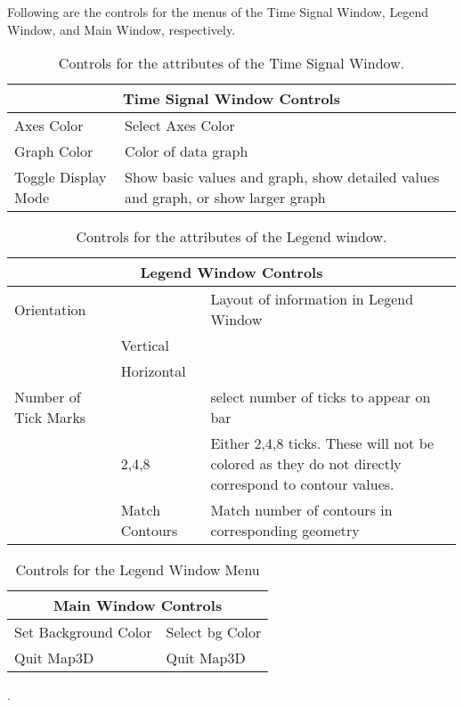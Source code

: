 Following are the controls for the menus of the Time Signal Window, Legend
Window, and Main Window, respectively.

\begin{table}[ht]
  \begin{center}
    \begin{tabular}{|l|p{4in}|} \hline
      \multicolumn{2}{|c|}{\textbf{Time Signal Window Controls}}
      \\ \hline \hline
      Axes Color & Select Axes Color \\
      Graph Color & Color of data graph \\  
      Toggle Display Mode & Show basic values and graph, show
      detailed values and graph, or show larger
      graph\\ \hline
    \end{tabular}
  \end{center}
\caption{Controls for the attributes of the Time Signal Window.}
\end{table}


\begin{table}[ht]
  \begin{center}
    \begin{tabular}{|l|l|p{3 in}|} \hline
      \multicolumn{3}{|c|}{\textbf{Legend Window Controls}} \\ \hline
    Orientation & & Layout of information in Legend Window\\
      & Vertical & \\
      & Horizontal & \\ \hline
    Number of Tick Marks & & select number of ticks to appear on bar \\
      & 2,4,8 & Either 2,4,8 ticks.  These will not be colored as they do not
        directly correspond to contour values. \\
      & Match Contours & Match number of contours in corresponding geometry
    \\ \hline 
    \end{tabular}
  \end{center}
\caption{Controls for the attributes of the Legend window.}
\end{table}

\begin{table}[ht]
  \begin{center}
    \begin{tabular}{|l|p{4in}|} \hline
      \multicolumn{2}{|c|}{\textbf{Main Window Controls}} \\ \hline \hline
      Set Background Color & Select bg Color \\
      Quit Map3D & Quit Map3D \\ \hline
    \end{tabular}
  \end{center}
\caption{Controls for the Legend Window Menu}.
\end{table}


